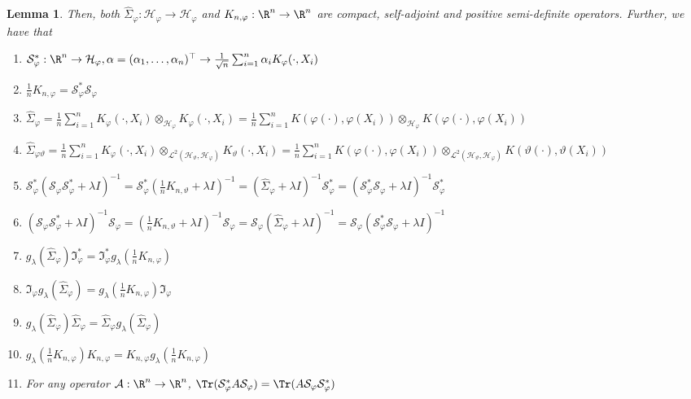 \documentclass{article} %
\newcommand{\I}{\mathfrak{I}}
\newcommand{\HS}{\mathcal{L}^{2}}
\newcommand{\rep}{\varphi}
\newcommand{\Hb}{\mathcal{H}_{\vartheta}}
\newcommand{\Hrep}{\mathcal{H}_{\varphi}}
\newcommand{\Srephat}{\hat{\Sigma}_{\rep}}
\newcommand{\Sabhat}{\hat{\Sigma}_{\varphi \vartheta}}
\newcommand{\Sreplambdainvhat}{(\Srephat+\lambda I)^{-1}}
\newcommand{\Irep}{\I_{\rep}}
\newcommand{\Irepad}{\Irep^{*}}
\newcommand{\Samprep}{\mathcal{S}_{\rep}}
\newcommand{\Samprepad}{\Samprep^{*}}
\newcommand{\Knrep}{K_{n,\rep}}
\newcommand{\Knb}{K_{n,\vartheta}}
\newcommand{\Knblambdainv}{(\frac{1}{n}\Knb+\lambda I)^{-1}}
\newcommand{\gl}{g_{\lambda}}
\theoremstyle{plain}
\newcounter{lemmano}
\newtheorem{lemma}[lemmano]{Lemma}
\begin{document}
\begin{lemma}
    Then, both $\Srephat: \Hrep \to \Hrep$ and $\Knrep: \R^n \to \R^n$ are compact, self-adjoint and positive semi-definite operators. Further, we have that
    \begin{enumerate}[label=(\roman*)] 
        \item \label{Sampling Elementary prop 1}
        $\Samprepad : \R^n \to \Hrep, \alpha = (\alpha_1,\dots,\alpha_n)^{\top} \to \frac{1}{\sqrt{n}}\sum_{i=1}^{n}\alpha_i K_{\rep}(\cdot,X_i)$
        \item \label{Sampling Elementary prop 2}
        $\frac{1}{n}\Knrep = \Samprepad\Samprep$
        \item \label{Sampling Elementary prop 3} $\Srephat=\frac{1}{n}\sum_{i=1}^{n}K_{\rep}(\cdot,X_{i}) \otimes_{\Hrep}  K_{\rep}(\cdot,X_{i})
    =\frac{1}{n}\sum_{i=1}^{n}K(\rep(\cdot),\rep(X_{i})) \otimes_{\Hrep} K(\rep(\cdot),\rep(X_{i}))$
        \item \label{Sampling Elementary prop 4} $\Sabhat=\frac{1}{n}\sum_{i=1}^{n}K_{\rep}(\cdot,X_{i}) \otimes_{\HS(\Hb,\Hrep)} K_{\vartheta}(\cdot,X_{i})
    =\frac{1}{n}\sum_{i=1}^{n}K(\rep(\cdot),\rep(X_{i})) \otimes_{\HS(\Hb,\Hrep)} K(\vartheta(\cdot),\vartheta(X_{i}))$
        \item \label{Sampling Elementary prop 5} $\Samprepad (\Samprep \Samprepad + \lambda I)^{-1} = \Samprepad\Knblambdainv = \Sreplambdainvhat \Samprepad = (\Samprepad \Samprep+\lambda I)^{-1}\Samprepad$
        \item \label{Sampling Elementary prop 6} $ (\Samprep \Samprepad + \lambda I)^{-1}\Samprep = \Knblambdainv \Samprep = \Samprep \Sreplambdainvhat = \Samprep (\Samprepad \Samprep+\lambda I)^{-1}$
        \item \label{Sampling Elementary prop 7} $\gl(\Srephat) \Irepad = \Irepad \gl(\frac{1}{n}\Knrep)$
        \item \label{Sampling Elementary prop 8} $\Irep \gl(\Srephat)  = \gl(\frac{1}{n}\Knrep) \Irep$
        \item \label{Sampling Elementary prop 9} $\gl(\Srephat) \Srephat = \Srephat \gl(\Srephat)$
        \item \label{Sampling Elementary prop 10} $\gl(\frac{1}{n}\Knrep)\Knrep = \Knrep \gl(\frac{1}{n}\Knrep)$
        \item \label{Sampling Elementary prop 11} For any operator $\mathcal{A} : \R^n \to \R^n$, $\Tr(\Samprepad A \Samprep) = \Tr( A \Samprep \Samprepad)$
    \end{enumerate}
\end{lemma}
\end{document}
